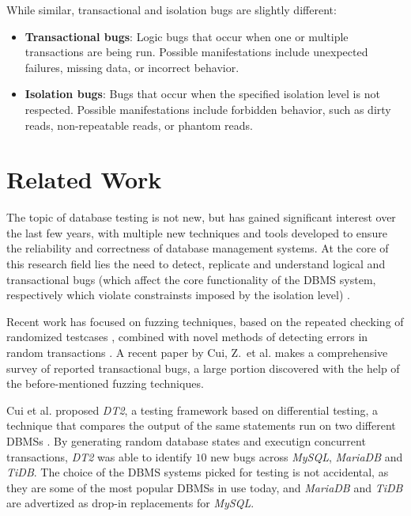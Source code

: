 While similar, transactional and isolation bugs are slightly different:
\begin{itemize}
    \item \textbf{Transactional bugs}: Logic bugs that occur when one or multiple transactions are being run. Possible manifestations include unexpected failures, missing data, or incorrect behavior.
    \item \textbf{Isolation bugs}: Bugs that occur when the specified isolation level is not respected. Possible manifestations include forbidden behavior, such as dirty reads, non-repeatable reads, or phantom reads.
\end{itemize}

\section{Related Work}

The topic of database testing is not new, but has gained significant interest over the last few years, with multiple new techniques and tools developed to ensure the reliability and correctness of database management systems. At the core of this research field lies the need to detect, replicate and understand logical and transactional bugs (which affect the core functionality of the DBMS system, respectively which violate constrainsts imposed by the isolation level) \cite{biswas2019complexity}.

Recent work has focused on fuzzing techniques, based on the repeated checking of randomized testcases \cite{aflwebpage}, combined with novel methods of detecting errors in random transactions \cite{jiang2023detecting, cui2022differentially_ASE2022, dou2023detecting_ICSE2023, clark2024validating, kingsbury2020elle}. A recent paper by Cui, Z.\ et al. \cite{cui2024understanding_ICSE2024} makes a comprehensive survey of reported transactional bugs, a large portion discovered with the help of the before-mentioned fuzzing techniques.

Cui et al. proposed \textit{DT2}, a testing framework based on differential testing, a technique that compares the output of the same statements run on two different DBMSs \cite{cui2022differentially_ASE2022}. By generating random database states and executign concurrent transactions, \textit{DT2} was able to identify $10$ new bugs across \textit{MySQL}, \textit{MariaDB} and \textit{TiDB}. The choice of the DBMS systems picked for testing is not accidental, as they are some of the most popular DBMSs in use today, and \textit{MariaDB} and \textit{TiDB} are advertized as drop-in replacements for \textit{MySQL}.

